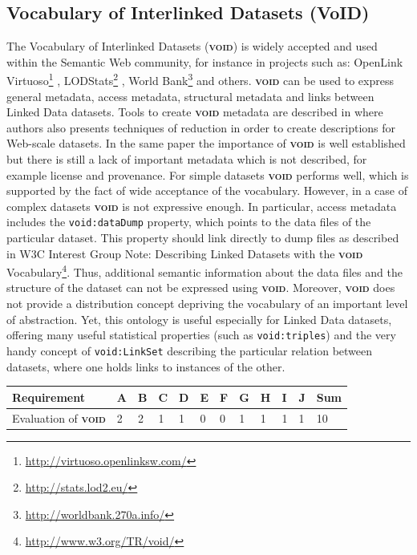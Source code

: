 \documentclass[a4paper,english,twoside,BCOR1.5cm,headsepline,DIV12,appendixprefix,final,12pt]{scrbook}
\newcommand{\void}{{\scshape\bfseries void}\xspace}
\newcommand{\prop}[1]{{{\texttt{#1}}}}
\newcommand\footnoteurl[1]{\footnote{\scriptsize\url{#1}}}
\begin{document}
\subsection{Vocabulary of Interlinked Datasets (VoID)}
\label{sec:void}

The Vocabulary of Interlinked Datasets (\void) \cite{Alexander09describinglinked} is widely accepted and used within the Semantic Web community, for instance in projects such as: OpenLink Virtuoso\footnoteurl{http://virtuoso.openlinksw.com/} , LODStats\footnoteurl{http://stats.lod2.eu/} , World Bank\footnoteurl{http://worldbank.270a.info/} and others. \void can be used to express general metadata, access metadata, structural metadata and links between Linked Data datasets. Tools to create \void metadata are described in \cite{DBLP:BohmLN11} where authors also presents techniques of reduction in order to create descriptions for Web-scale datasets. In the same paper the importance of \void is well established but there is still a lack of important metadata which is not described, for example license and provenance. For simple datasets \void performs well, which is supported by the fact of wide acceptance of the vocabulary. 
However, in a case of complex datasets \void is not expressive enough. In particular, access metadata includes the \prop{void:dataDump} property, which points to the data files of the particular dataset. This property should link directly to dump files as described in W3C Interest Group Note: Describing Linked Datasets with the \void Vocabulary\footnoteurl{http://www.w3.org/TR/void/}. Thus, additional semantic information about the data files and the structure of the dataset can not be expressed using \void. Moreover, \void does not provide a distribution concept depriving the vocabulary of an important level of abstraction. Yet, this ontology is useful especially for Linked Data datasets, offering many useful statistical properties (such as \prop{void:triples}) and the very handy concept of \prop{void:LinkSet} describing the particular relation between datasets, where one holds links to instances of the other.

\begin{table}[!htbp]
    \centering
    \begin{tabular}{|l|l|l|l|l|l|l|l|l|l|l|l|}
        \hline
        Requirement & A & B & C & D & E & F & G & H & I & J & Sum \\
        \hline
        Evaluation of \void & 2 & 2 & 1 & 1 & 0 & 0 & 1 & 1 & 1 & 1 & 10 \\
        \hline
    \end{tabular}
    \label{tab:evalvoid}
\end{table}
\end{document}
